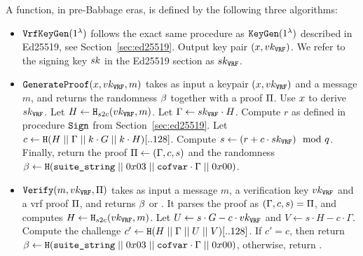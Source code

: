 A \vrf function, in pre-Babbage eras, is defined by the following three algorithms:
\begin{itemize}
\item $\texttt{VrfKeyGen}(1^\lambda)$ follows the exact same procedure as $\texttt{KeyGen}(1^\lambda)$ described in Ed25519, see Section~\ref{sec:ed25519}. Output key pair $(x, vk_{\texttt{VRF}})$. We refer to the signing key $sk$ in the Ed25519 section as $sk_{\texttt{VRF}}$.
\item $\texttt{GenerateProof}(x, vk_{\texttt{VRF}}, m)$ takes as input a keypair $(x, vk_{\texttt{VRF}})$ and a message $m$, and returns the \vrf randomness $\beta$ together with a proof $\Pi$. Use $x$ to derive $sk_{\texttt{VRF}}$. Let $H \gets \texttt{H}_{s2c}(vk_{\texttt{VRF}}, m)$. Let $\Gamma \gets sk_{\texttt{VRF}}\cdot H$. Compute $r$ as defined in procedure $\texttt{Sign}$ from Section~\ref{sec:ed25519}. Let $c \gets \texttt{H}(H\;||\;\Gamma\;||\; k\cdot G\;||\; k\cdot H)[..128]$. Compute $s \gets (r + c\cdot sk_{\texttt{VRF}})\mod{q}$. Finally, return the proof $\Pi \gets (\Gamma, c, s)$ and the randomness $\beta \gets \texttt{H}(\texttt{suite\_string}\;||\; 0x03\;||\;\texttt{cofvar}\cdot\Gamma\;||\; 0x00)$.
\item $\texttt{Verify}(m, vk_{\texttt{VRF}}, \Pi)$ takes as input a message $m$, a verification key $vk_{\texttt{VRF}}$ and a vrf proof $\Pi$, and returns $\beta$ or \false. It parses the proof as $(\Gamma, c, s) = \Pi$, and computes $H\gets\texttt{H}_{s2c}(vk_{\texttt{VRF}}, m)$. Let $U \gets s\cdot G - c\cdot vk_{\texttt{VRF}}$ and $V \gets s\cdot H - c\cdot\Gamma$. Compute the challenge $c'\gets\texttt{H}(H\;||\;\Gamma\;||\; U\;||\; V)[..128]$. If $c'=c$, then return $\beta \gets  \texttt{H}(\texttt{suite\_string}\;||\; 0x03\;||\;\texttt{cofvar}\cdot\Gamma\;||\; 0x00)$, otherwise, return \false.
\end{itemize}

